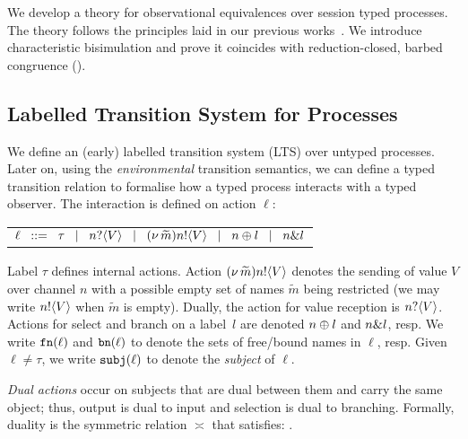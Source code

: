 \noi We develop a theory for observational equivalences over
session typed \HOp processes. The theory follows the principles
laid in our previous works~\cite{KYHH2015,KY2015}.
We introduce 
characteristic bisimulation
and prove
it coincides
with reduction-closed,
barbed congruence ().


\subsection{Labelled Transition System for Processes}\label{ss:lts}
\noi We define an (early) labelled transition system (LTS) over
untyped processes. 
Later on, using the \emph{environmental} transition semantics, 
we can define a typed transition relation to formalise 
how a typed process interacts with a typed observer. 
The interaction is defined on action $\ell$:
\begin{center}
\begin{tabular}{l}
	$\ell	\;\;::=\;\;   \tau 
		\;\;\;|\;\;\;	n ? \langle V \rangle 
		\;\;\;|\;\;\;	(\nu\, \widetilde{m}) n ! \langle V \rangle
		\;\;\;|\;\;\;	n \oplus l 
		\;\;\;|\;\;\;	n \& l $
\end{tabular}
\end{center}
\noi 
Label $\tau$ defines internal actions.
Action $(\nu\, \widetilde{m}) n ! \langle V \rangle$ denotes the sending of value $V$
over channel $n$ with
a possible empty set of names $\widetilde{m}$ being restricted 
(we may write $n ! \langle V \rangle$ when $\widetilde{m}$ is empty).
Dually, the action for value reception is 
$n ? \langle V \rangle$.
Actions for select
and branch on
a label~$l$ are denoted $n \oplus l$ and $n \& l$, resp.
We write $\mathtt{fn}(\ell)$ and $\mathtt{bn}(\ell)$ to denote the
 sets of free/bound names in $\ell$, resp.
Given $\ell \neq \tau$, we write 
$\mathtt{subj}(\ell)$
to denote the \emph{subject} of $\ell$.


\emph{Dual actions} %
occur on subjects that are dual between them and carry the same
object; thus, output is dual to input and 
selection is dual to branching.
Formally, duality 
is the symmetric relation $\asymp$ that satisfies:
.
%
%
\smallskip



